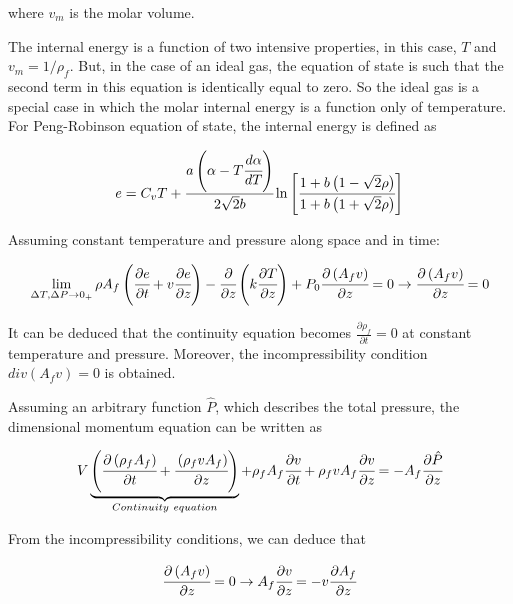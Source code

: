 \documentclass[../Article_Model_Parameters.tex]{subfiles}
\begin{document}
	where $v_m$ is the molar volume.
	
	The internal energy is a function of two intensive properties, in this case, $T$ and $v_m=1/\rho_f$. But, in the case of an ideal gas, the equation of state is such that the second term in this equation is identically equal to zero. So the ideal gas is a special case in which the molar internal energy is a function only of temperature. For Peng-Robinson equation of state, the internal energy is defined as 
	
	{\footnotesize
		\begin{equation*}
			e = C_vT + \cfrac{a\left(\alpha -T\cfrac{d \alpha}{dT}\right)}{2\sqrt{2}b} \ln \left[ \cfrac{1+b\left(1-\sqrt{2}\rho\right) }{1+b\left(1+\sqrt{2}\rho\right)} \right]
	\end{equation*} }
	
	Assuming constant temperature and pressure along space and in time:
	
	{\footnotesize
		\begin{equation*}
			\lim_{\Delta T, \Delta P \rightarrow 0_+ } \rho A_f \left( \cfrac{\partial e }{\partial t} + v \cfrac{\partial e}{\partial z} \right) - \cfrac{\partial}{\partial z} \left( k \cfrac{\partial T}{\partial z} \right) + P_0 \cfrac{\partial \left(A_f v\right)}{\partial z} = 0 \rightarrow \cfrac{\partial \left(A_f v\right)}{\partial z} = 0
		\end{equation*}
	}
	
	It can be deduced that the continuity equation becomes $\frac{\partial \rho_f}{\partial t} = 0$ at constant temperature and pressure. Moreover, the incompressibility condition $div(A_fv)=0$ is obtained.
	
	Assuming an arbitrary function $\hat{P}$, which describes the total pressure, the dimensional momentum equation can be written as
	
	{\footnotesize
		\begin{equation*}
			V \underbrace{ \left( \cfrac{\partial \left(\rho_f A_f\right)}{\partial t} + \cfrac{\left(\rho_f v A_f\right)}{\partial z} \right) }_{Continuity~equation} + \rho_f A_f \cfrac{\partial v}{\partial t} + \rho_f v A_f \cfrac{\partial v}{\partial z} = - A_f \cfrac{\partial \hat{P}}{\partial z}
		\end{equation*}
	}
	
	From the incompressibility conditions, we can deduce that
	
	{\footnotesize
		\begin{equation*}
			\cfrac{\partial \left(A_f v\right)}{\partial z} = 0 \rightarrow A_f \cfrac{\partial v}{\partial z} = - v \cfrac{\partial A_f}{\partial z}
		\end{equation*}
	}
	
\end{document}
